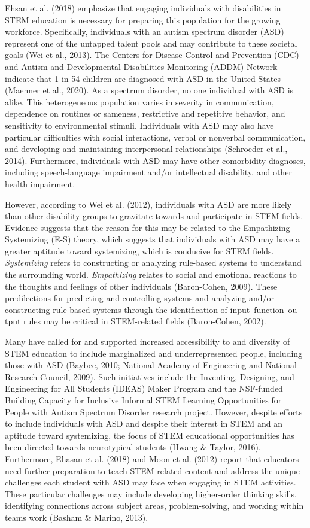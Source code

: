 \documentclass[11.5pt]{sig-alternate}
\begin{document}
\begin{large}
Ehsan et al. (2018) emphasize that engaging individuals with disabilities in STEM education is necessary for preparing this population for the growing workforce. Specifically, individuals with an autism spectrum disorder (ASD) represent one of the untapped talent pools and may contribute to these societal goals (Wei et al., 2013). The Centers for Disease Control and Prevention (CDC) and Autism and Developmental Disabilities Monitoring (ADDM) Network indicate that 1 in 54 children are diagnosed with ASD in the United States (Maenner et al., 2020). As a spectrum disorder, no one individual with ASD is alike. This heterogeneous population varies in severity in communication, dependence on routines or sameness, restrictive and repetitive behavior, and sensitivity to environmental stimuli. Individuals with ASD may also have particular difficulties with social interactions, verbal or nonverbal communication, and developing and maintaining interpersonal relationships (Schroeder et al., 2014). Furthermore, individuals with ASD may have other comorbidity diagnoses, including speech-language impairment and/or intellectual disability, and other health impairment. 

However, according to Wei et al. (2012), individuals with ASD are more likely than other disability groups to gravitate towards and participate in STEM fields. Evidence suggests that the reason for this may be related to the Empathizing– Systemizing (E-S) theory, which suggests that individuals with ASD may have a greater aptitude toward systemizing, which is conducive for STEM fields. \textit{Systemizing} refers to constructing or analyzing rule-based systems to understand the surrounding world. \textit{Empathizing} relates to social and emotional reactions to the thoughts and feelings of other individuals (Baron-Cohen, 2009). These predilections for predicting and controlling systems and analyzing and/or constructing rule-based systems through the identification of input–function–ou-tput rules may be critical in STEM-related fields (Baron-Cohen, 2002).

Many have called for and supported increased accessibility to and diversity of STEM education to include marginalized and underrepresented people, including those with ASD (Baybee, 2010; National Academy of Engineering and National Research Council, 2009). Such initiatives include the Inventing, Designing, and Engineering for All Students (IDEAS) Maker Program and the NSF-funded Building Capacity for Inclusive Informal STEM Learning Opportunities for People with Autism Spectrum Disorder research project. However, despite efforts to include individuals with ASD and despite their interest in STEM and an aptitude toward systemizing, the focus of STEM educational opportunities has been directed towards neurotypical students (Hwang \& Taylor, 2016). Furthermore, Ehasan et al. (2018) and Moon et al. (2012) report that educators need further preparation to teach STEM-related content and address the unique challenges each student with ASD may face when engaging in STEM activities. These particular challenges may include developing higher-order thinking skills, identifying connections across subject areas, problem-solving, and working within teams work (Basham \& Marino, 2013).	


\end{large}
\end{document}
